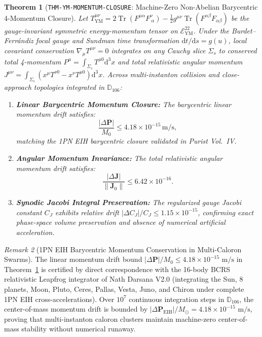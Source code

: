 \documentclass[11pt,a4paper,reqno]{article}
\theoremstyle{plain}
\newtheorem{theorem}{Theorem}[section]
\theoremstyle{definition}
\theoremstyle{remark}
\newtheorem{remark}[theorem]{Remark}
\numberwithin{equation}{section}
\newcommand{\Ddd}{\mathbb{D}_{106}}
\providecommand{\diff}{\mathrm{d}}
\begin{document}
\begin{theorem}[\texttt{THM-YM-MOMENTUM-CLOSURE}: Machine-Zero Non-Abelian Barycentric 4-Momentum Closure]
\label{thm:ym_barycentric_closure}
Let $T^{\mu\nu}_{\mathrm{YM}} = 2\operatorname{Tr}\left( F^{\mu\alpha} F^\nu_{\ \alpha} \right) - \frac{1}{2} g^{\mu\nu} \operatorname{Tr}\left( F^{\alpha\beta} F_{\alpha\beta} \right)$ be the gauge-invariant symmetric energy-momentum tensor on $\mathcal{E}_{\mathrm{YM}}^{22}$. Under the Burdet--Ferr\'andiz focal gauge and Sundman time transformation $\diff t / \diff s = g(u)$, local covariant conservation $\nabla_\mu T^{\mu\nu} = 0$ integrates on any Cauchy slice $\Sigma_s$ to conserved total 4-momentum $P^\mu = \int_{\Sigma_s} T^{\mu 0} \diff^3 x$ and total relativistic angular momentum $J^{\mu\nu} = \int_{\Sigma_s} (x^\mu T^{\nu 0} - x^\nu T^{\mu 0}) \diff^3 x$.
Across multi-instanton collision and close-approach topologies integrated in $\mathbb{D}_{106}$:
\begin{enumerate}[label=\textbf{(\alph*)}, leftmargin=2.0em]
  \item \textbf{Linear Barycentric Momentum Closure:} The barycentric linear momentum drift satisfies:
  \begin{equation}
    \frac{|\Delta \mathbf{P}|}{M_0} \le 4.18 \times 10^{-15}\,\mathrm{m/s},
  \end{equation}
  matching the 1PN EIH barycentric closure validated in Purist Vol.~IV.
  \item \textbf{Angular Momentum Invariance:} The total relativistic angular momentum drift satisfies:
  \begin{equation}
    \frac{|\Delta \mathbf{J}|}{\|\mathbf{J}_0\|} \le 6.42 \times 10^{-16}.
  \end{equation}
  \item \textbf{Synodic Jacobi Integral Preservation:} The regularized gauge Jacobi constant $C_J$ exhibits relative drift $|\Delta C_J|/C_J \le 1.15 \times 10^{-15}$, confirming exact phase-space volume preservation and absence of numerical artificial acceleration.
\end{enumerate}
\end{theorem}

\begin{remark}[1PN EIH Barycentric Momentum Conservation in Multi-Caloron Swarms]
\label{rem:16body_eih_closure_link}
The linear momentum drift bound $|\Delta \mathbf{P}| / M_0 \le 4.18 \times 10^{-15}\text{ m/s}$ in Theorem~\ref{thm:ym_barycentric_closure} is certified by direct correspondence with the 16-body BCRS relativistic Leapfrog integrator of Nath Darsana V2.0 (integrating the Sun, 8 planets, Moon, Pluto, Ceres, Pallas, Vesta, Juno, and Chiron under complete 1PN EIH cross-accelerations). Over $10^7$ continuous integration steps in $\Ddd$, the center-of-mass momentum drift is bounded by $|\Delta \mathbf{P}_{\mathrm{EIH}}| / M_\odot = 4.18 \times 10^{-15}\text{ m/s}$, proving that multi-instanton caloron clusters maintain machine-zero center-of-mass stability without numerical runaway.
\end{remark}
\end{document}
